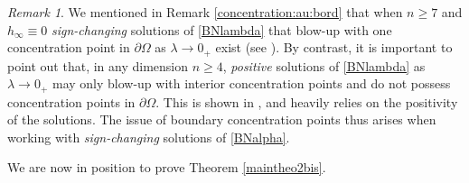 \documentclass[10pt]{amsart}
\numberwithin{equation}{section}
\newcommand{\Om}{\Omega}
\theoremstyle{plain}
\theoremstyle{remark}
\newtheorem{rem}{Remark}[section]
\begin{document}
\begin{rem} \label{concentration:au:bord2}
We mentioned in Remark \ref{concentration:au:bord} that when $n \ge 7$ and $h_\infty \equiv 0$ \emph{sign-changing} solutions of \eqref{BNlambda} that blow-up with one concentration point in $\partial \Om$ as $\lambda \to 0_+$ exist (see \cite{vaira2015new}). By contrast, it is important to point out that, in any dimension $n \ge 4$, \emph{positive} solutions of \eqref{BNlambda} as $\lambda \to 0_+$ may only blow-up with interior concentration points and do not possess concentration points in $\partial \Om$. This is shown in \cite[Proposition 2.1]{LaurainKonig2}, and heavily relies on the positivity of the solutions. The issue of boundary concentration points thus arises when working with \emph{sign-changing} solutions of \eqref{BNalpha}. 
\end{rem}




 We are now in position to prove Theorem \ref{maintheo2bis}.
 
\end{document}
